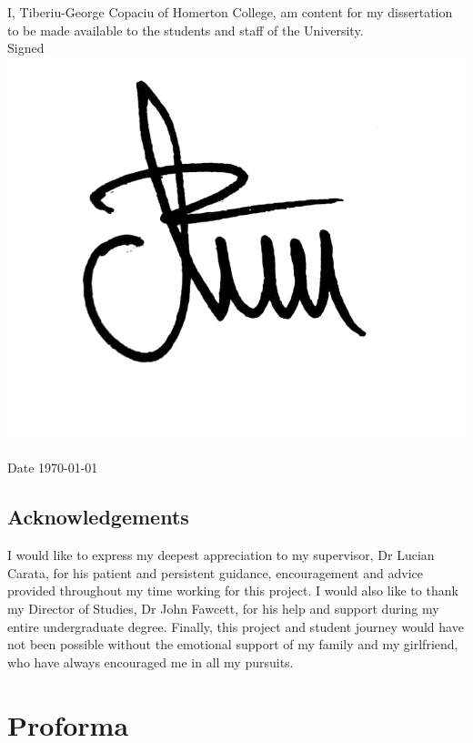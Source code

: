 \documentclass[12pt,a4paper,oneside]{report}
\begin{document}
\noindent
I, Tiberiu-George Copaciu of Homerton College,
am content for my dissertation to be made available to the students and staff of the University. \\

\noindent
Signed
\includegraphics[height=1.5\baselineskip]{Images/signature.jpg}
\\ \\
Date \today

\section*{Acknowledgements}

I would like to express my deepest appreciation to my supervisor, Dr Lucian Carata, for his patient and persistent guidance, encouragement and advice provided throughout my time working for this project. I would also like to thank my Director of Studies, Dr John Fawcett, for his help and support during my entire undergraduate degree. Finally, this project and student journey would have not been possible without the emotional support of my family and my girlfriend, who have always encouraged me in all my pursuits.

\newpage


\chapter*{Proforma}
\end{document}
